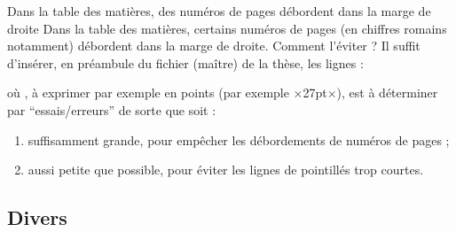 \begin{dbfaq}{Dans la table des matières, des numéros de pages débordent dans
    la marge de droite}{}
  Dans la table des matières, certains numéros de pages (en chiffres romains
  notamment) débordent dans la marge de droite. Comment l'éviter ?
  \tcblower
  Il suffit d'insérer, en préambule du fichier (maître) de la thèse, les
  lignes :
\begin{preamblecode}[title=Par exemple dans le \File{\configurationfile}]
\makeatletter
\renewcommand*\@pnumwidth{÷\meta{distance}÷}
\makeatother
\end{preamblecode}
  où , à exprimer par exemple en points (par exemple ×27pt×),
  est à déterminer par \enquote{essais/erreurs} de sorte que 
  soit :
  \begin{enumerate}
  \item suffisamment grande, pour empêcher les débordements de numéros de
    pages ;
  \item aussi petite que possible, pour éviter les lignes de pointillés trop
    courtes.
  \end{enumerate}
\end{dbfaq}

\subsection{Divers}
\label{sec:divers}

